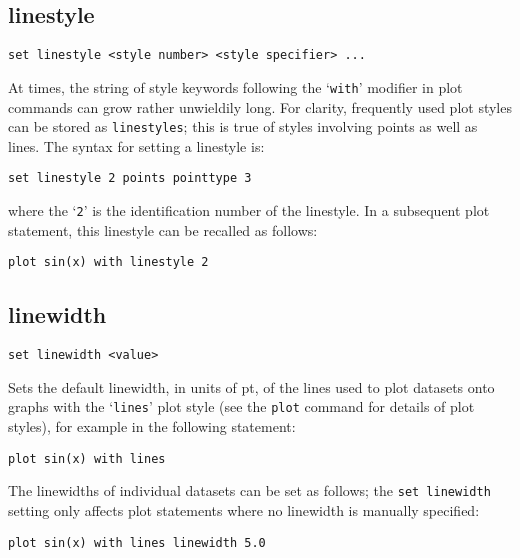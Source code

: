 \documentclass[a4paper,onecolumn,11pt]{book}
\begin{document}
\subsection{linestyle}

\begin{verbatim}
set linestyle <style number> <style specifier> ...
\end{verbatim}

At times, the string of style keywords following the `{\tt with}' modifier in plot
commands can grow rather unwieldily long. For clarity, frequently used plot
styles can be stored as {\tt linestyles}; this is true of styles involving
points as well as lines. The syntax for setting a linestyle is:

\begin{verbatim}
set linestyle 2 points pointtype 3
\end{verbatim}

\noindent where the `{\tt 2}' is the identification number of the linestyle. In a subsequent
plot statement, this linestyle can be recalled as follows:

\begin{verbatim}
plot sin(x) with linestyle 2
\end{verbatim}


\subsection{linewidth}

\begin{verbatim}
set linewidth <value>
\end{verbatim}

Sets the default linewidth, in units of pt, of the lines used to plot datasets
onto graphs with the `{\tt lines}' plot style (see the {\tt plot} command for
details of plot styles), for example in the following statement:

\begin{verbatim}
plot sin(x) with lines
\end{verbatim}

The linewidths of individual datasets can be set as follows; the {\tt set
linewidth} setting only affects plot statements where no linewidth is manually
specified:

\begin{verbatim}
plot sin(x) with lines linewidth 5.0
\end{verbatim}
\end{document}
